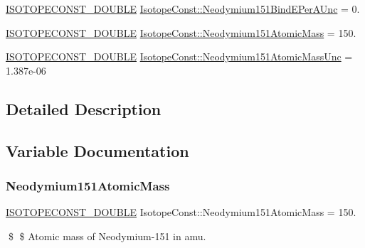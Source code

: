 \begin{DoxyCompactItemize}
\mbox{\hyperlink{group___isotope_const-_macros_ga8f45a7272ce02c0b4c65c44636ed719a}{I\+S\+O\+T\+O\+P\+E\+C\+O\+N\+S\+T\+\_\+\+D\+O\+U\+B\+LE}} \mbox{\hyperlink{group___isotope_const-_neodymium-_nd151_ga0889b92ff4d70da8fa7a7fb7e75bfaff}{Isotope\+Const\+::\+Neodymium151\+Bind\+E\+Per\+A\+Unc}} = 0.
\item 
\mbox{\hyperlink{group___isotope_const-_macros_ga8f45a7272ce02c0b4c65c44636ed719a}{I\+S\+O\+T\+O\+P\+E\+C\+O\+N\+S\+T\+\_\+\+D\+O\+U\+B\+LE}} \mbox{\hyperlink{group___isotope_const-_neodymium-_nd151_ga05914c7c361faf736a697391fbab01b6}{Isotope\+Const\+::\+Neodymium151\+Atomic\+Mass}} = 150.
\item 
\mbox{\hyperlink{group___isotope_const-_macros_ga8f45a7272ce02c0b4c65c44636ed719a}{I\+S\+O\+T\+O\+P\+E\+C\+O\+N\+S\+T\+\_\+\+D\+O\+U\+B\+LE}} \mbox{\hyperlink{group___isotope_const-_neodymium-_nd151_ga16bcafb931b4c32349badcfc877ec54f}{Isotope\+Const\+::\+Neodymium151\+Atomic\+Mass\+Unc}} = 1.\+387e-\/06
\end{DoxyCompactItemize}


\subsection{Detailed Description}


\subsection{Variable Documentation}
\mbox{\label{group___isotope_const-_neodymium-_nd151_ga05914c7c361faf736a697391fbab01b6}} 
\subsubsection{\texorpdfstring{Neodymium151\+Atomic\+Mass}{Neodymium151AtomicMass}}
{\footnotesize\ttfamily \mbox{\hyperlink{group___isotope_const-_macros_ga8f45a7272ce02c0b4c65c44636ed719a}{I\+S\+O\+T\+O\+P\+E\+C\+O\+N\+S\+T\+\_\+\+D\+O\+U\+B\+LE}} Isotope\+Const\+::\+Neodymium151\+Atomic\+Mass = 150.}

\$ \$ Atomic mass of Neodymium-\/151 in amu. \mbox{\label{group___isotope_const-_neodymium-_nd151_ga16bcafb931b4c32349badcfc877ec54f}} 
